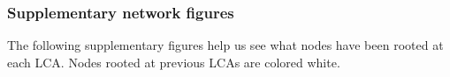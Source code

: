 \begin{Shaded}
\begin{Highlighting}[]
\NormalTok{(}
\NormalTok{  ,}
\NormalTok{  ,} \OperatorTok{*}
\NormalTok{  ,} \OperatorTok{*}
\NormalTok{  ,}
\NormalTok{  ,}
\NormalTok{)}
\end{Highlighting}
\end{Shaded}

\hypertarget{supplementary-network-figures}{%
\subsubsection{Supplementary network
figures}\label{supplementary-network-figures}}

The following supplementary figures help us see what nodes have been
rooted at each LCA. Nodes rooted at previous LCAs are colored white.

